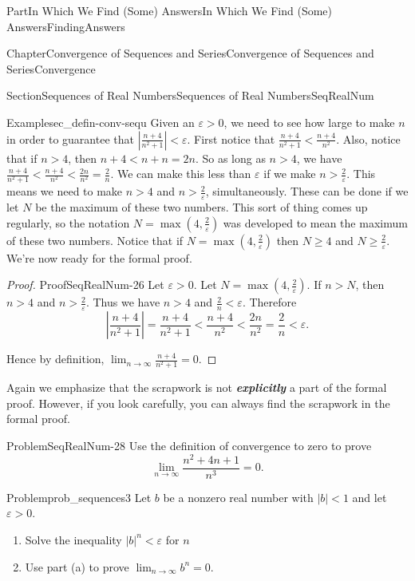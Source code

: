 \documentclass[oneside,10pt,]{book}
\newcommand{\alert}[1]{\textbf{\textit{#1}}}
\numberwithin{equation}{part}
\newcommand{\abs}[1]{\left|#1\right|}
\newcommand{\eps}{\varepsilon}
\newcommand{\lt}{<}
\begin{document}
\begin{partptx}{Part}{In Which We Find (Some) Answers}{}{In Which We Find (Some) Answers}{}{}{FindingAnswers}
\begin{chapterptx}{Chapter}{Convergence of Sequences and Series}{}{Convergence of Sequences and Series}{}{}{Convergence}
\begin{sectionptx}{Section}{Sequences of Real Numbers}{}{Sequences of Real Numbers}{}{}{SeqRealNum}
\begin{example}{Example}{}{sec_defin-conv-sequ}
Given an \(\eps>0\), we need to see how large to make \(n\) in order to guarantee that \(|\frac{n+4}{n^2+1}|\lt \eps\). First notice that \(\frac{n+4}{n^2+1}\lt \frac{n+4}{n^2}\). Also, notice that if \(n>4\), then \(n+4\lt n+n=2n\). So as long as \(n>4\), we have \(\frac{n+4}{n^2+1}\lt \frac{n+4}{n^2}\lt \frac{2n}{n^2}=\frac{2}{n}\). We can make this less than \(\eps\) if we make \(n>\frac{2}{\eps}\). This means we need to make \(n>4\) and \(n>\frac{2}{\eps}\), simultaneously. These can be done if we let \(N\) be the maximum of these two numbers. This sort of thing comes up regularly, so the notation \(N=\max\left(4,\frac{2}{\eps}\right)\) was developed to mean the maximum of these two numbers. Notice that if \(N=\max\left(4, \frac{2}{\eps}\right)\) then \(N\geq 4\) and \(N\geq\frac{2}{\eps}\). We're now ready for the formal proof.%
\end{example}
\begin{proof}{Proof}{}{SeqRealNum-26}
Let \(\eps>0\). Let \(N=\max\left(4,\frac{2}{\eps}\right)\). If \(n>N\), then \(n>4\) and \(n>\frac{2}{\eps}\). Thus we have \(n>4\) and \(\frac{2}{n}\lt \eps\). Therefore%
\begin{equation*}
\abs{\frac{n+4}{n^2+1}}=\frac{n+4}{n^2+1}\lt \frac{n+4}{n^2}\lt \frac{2n}{n^2}= \frac{2}{n}\lt \eps\text{.}
\end{equation*}
%
\par
Hence by definition, \(\displaystyle\lim_{n\rightarrow\infty}\frac{n+4}{n^2+1}=0\).%
\end{proof}
Again we emphasize that the scrapwork is not \alert{explicitly} a part of the formal proof.  However, if you look carefully, you can always find the scrapwork in the formal proof.%
\begin{problem}{Problem}{}{SeqRealNum-28}%
 Use the definition of convergence to zero to prove%
\begin{equation*}
\lim_{n\rightarrow\infty}\frac{n^2+4n+1}{n^3}=0.{}
\end{equation*}
%
\end{problem}
\begin{problem}{Problem}{}{prob_sequences3}%
Let \(b\) be a nonzero real number with \(|b|\lt 1\) and let \(\eps>0\).%
\begin{enumerate}[font=\bfseries,label=(\alph*),ref=\alph*]%
\item{}Solve the inequality \(|b|^n\lt \eps\) for \(n\)%
\item{}Use part (a) to prove \(\lim_{n\rightarrow\infty}b^n=0\).%

\end{enumerate}
\end{problem}
\end{sectionptx}
\end{chapterptx}
\end{partptx}
\end{document}
